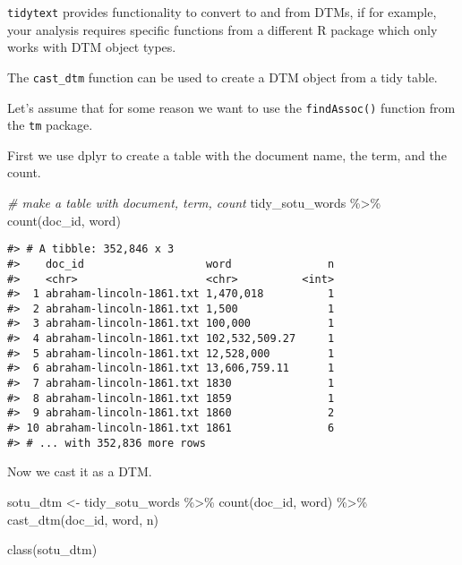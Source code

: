 \documentclass[
]{book}
\newenvironment{Shaded}{\begin{snugshade}}{\end{snugshade}}
\newcommand{\CommentTok}[1]{\textcolor[rgb]{0.56,0.35,0.01}{\textit{#1}}}
\newcommand{\FunctionTok}[1]{\textcolor[rgb]{0.00,0.00,0.00}{#1}}
\newcommand{\NormalTok}[1]{#1}
\newcommand{\OtherTok}[1]{\textcolor[rgb]{0.56,0.35,0.01}{#1}}
\newcommand{\SpecialCharTok}[1]{\textcolor[rgb]{0.00,0.00,0.00}{#1}}
\begin{document}
\texttt{tidytext} provides functionality to convert to and from DTMs, if for example, your analysis requires specific functions from a different R package which only works with DTM object types.

The \texttt{cast\_dtm} function can be used to create a DTM object from a tidy table.

Let's assume that for some reason we want to use the \texttt{findAssoc()} function from the \texttt{tm} package.

First we use dplyr to create a table with the document name, the term, and the count.

\begin{Shaded}
\begin{Highlighting}[]
\CommentTok{\# make a table with document, term, count}
\NormalTok{tidy\_sotu\_words }\SpecialCharTok{\%\textgreater{}\%} 
  \FunctionTok{count}\NormalTok{(doc\_id, word) }
\end{Highlighting}
\end{Shaded}

\begin{verbatim}
#> # A tibble: 352,846 x 3
#>    doc_id                   word               n
#>    <chr>                    <chr>          <int>
#>  1 abraham-lincoln-1861.txt 1,470,018          1
#>  2 abraham-lincoln-1861.txt 1,500              1
#>  3 abraham-lincoln-1861.txt 100,000            1
#>  4 abraham-lincoln-1861.txt 102,532,509.27     1
#>  5 abraham-lincoln-1861.txt 12,528,000         1
#>  6 abraham-lincoln-1861.txt 13,606,759.11      1
#>  7 abraham-lincoln-1861.txt 1830               1
#>  8 abraham-lincoln-1861.txt 1859               1
#>  9 abraham-lincoln-1861.txt 1860               2
#> 10 abraham-lincoln-1861.txt 1861               6
#> # ... with 352,836 more rows
\end{verbatim}

Now we cast it as a DTM.

\begin{Shaded}
\begin{Highlighting}[]
\NormalTok{sotu\_dtm }\OtherTok{\textless{}{-}}\NormalTok{ tidy\_sotu\_words }\SpecialCharTok{\%\textgreater{}\%} 
  \FunctionTok{count}\NormalTok{(doc\_id, word) }\SpecialCharTok{\%\textgreater{}\%} 
  \FunctionTok{cast\_dtm}\NormalTok{(doc\_id, word, n) }

\FunctionTok{class}\NormalTok{(sotu\_dtm)}
\end{Highlighting}
\end{Shaded}
\end{document}
